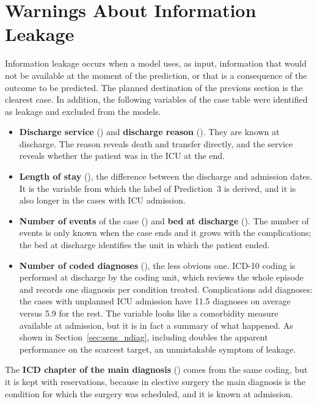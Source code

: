 \section{Warnings About Information Leakage}
\label{sec:fugas}

Information leakage occurs when a model uses, as input, information that would not be available at the moment of the prediction, or that is a consequence of the outcome to be predicted. The planned destination of the previous section is the clearest case. In addition, the following variables of the case table were identified as leakage and excluded from the models.

\begin{itemize}[leftmargin=*]
  \item \textbf{Discharge service} () and \textbf{discharge reason} (). They are known at discharge. The reason reveals death and transfer directly, and the service reveals whether the patient was in the ICU at the end.
  \item \textbf{Length of stay} (), the difference between the discharge and admission dates. It is the variable from which the label of Prediction~3 is derived, and it is also longer in the cases with ICU admission.
  \item \textbf{Number of events} of the case () and \textbf{bed at discharge} (). The number of events is only known when the case ends and it grows with the complications; the bed at discharge identifies the unit in which the patient ended.
  \item \textbf{Number of coded diagnoses} (), the less obvious one. ICD-10 coding is performed at discharge by the coding unit, which reviews the whole episode and records one diagnosis per condition treated. Complications add diagnoses: the cases with unplanned ICU admission have 11.5 diagnoses on average versus 5.9 for the rest. The variable looks like a comorbidity measure available at admission, but it is in fact a summary of what happened. As shown in Section~\ref{sec:sens_ndiag}, including  doubles the apparent performance on the scarcest target, an unmistakable symptom of leakage.
\end{itemize}

The \textbf{ICD chapter of the main diagnosis} () comes from the same coding, but it is kept with reservations, because in elective surgery the main diagnosis is the condition for which the surgery was scheduled, and it is known at admission.

